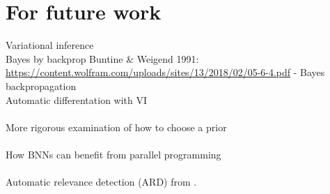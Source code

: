 \chapter{For future work}

Variational inference\\
Bayes by backprop
Buntine \& Weigend 1991: \url{https://content.wolfram.com/uploads/sites/13/2018/02/05-6-4.pdf} - Bayes backpropagation\\
Automatic differentation with VI
\\
\\
More rigorous examination of how to choose a prior
\\
\\
How BNNs can benefit from parallel programming
\\
\\
Automatic relevance detection (ARD) from \cite{neal2012bayesian}.